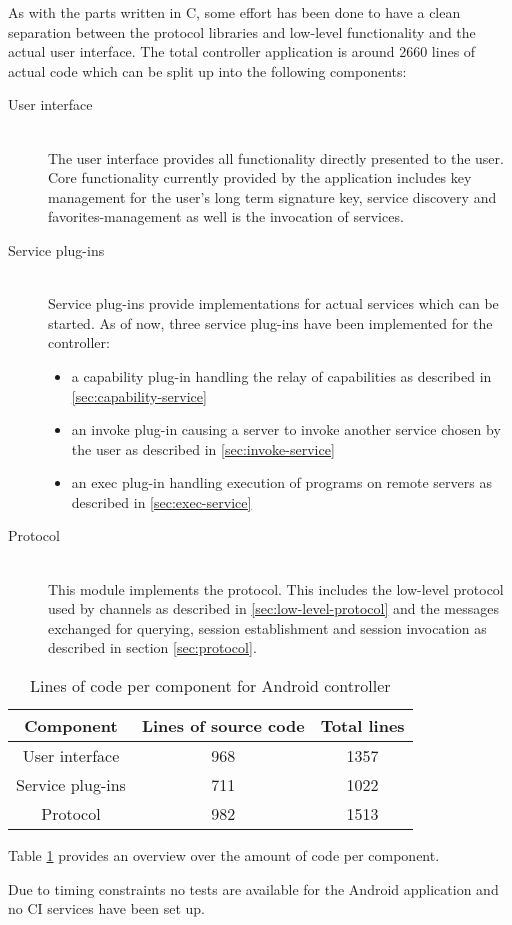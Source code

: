 As with the parts written in C, some effort has been done to have a clean separation between the protocol libraries and low-level functionality and the actual user interface.
The total controller application is around 2660 lines of actual code which can be split up into the following components:
\begin{description}
    \item[User interface]\hfill\\
        The user interface provides all functionality directly presented to the user.
        Core functionality currently provided by the application includes key management for the user's long term signature key, service discovery and favorites-management as well is the invocation of services.
    \item[Service plug-ins]\hfill\\
        Service plug-ins provide implementations for actual services which can be started.
        As of now, three service plug-ins have been implemented for the controller:
        \begin{itemize}
            \item a capability plug-in handling the relay of capabilities as described in \ref{sec:capability-service}
            \item an invoke plug-in causing a server to invoke another service chosen by the user as described in \ref{sec:invoke-service}
            \item an exec plug-in handling execution of programs on remote servers as described in \ref{sec:exec-service}
        \end{itemize}
    \item[Protocol]\hfill\\
        This module implements the protocol.
        This includes the low-level protocol used by channels as described in \ref{sec:low-level-protocol} and the messages exchanged for querying, session establishment and session invocation as described in section \ref{sec:protocol}.
\end{description}

\begin{table}
    \centering
    \begin{tabular}{|c|c|c|}
        \hline
        \bfseries Component & \bfseries Lines of source code & \bfseries Total lines\\
        \hline
        User interface & 968 & 1357\\
        \hline
        Service plug-ins & 711 & 1022\\
        \hline
        Protocol & 982 & 1513\\
        \hline
    \end{tabular}
    \caption{Lines of code per component for Android controller}
    \label{tab:sloc-controller}
\end{table}

Table \ref{tab:sloc-controller} provides an overview over the amount of code per component.

Due to timing constraints no tests are available for the Android application and no CI services have been set up.

